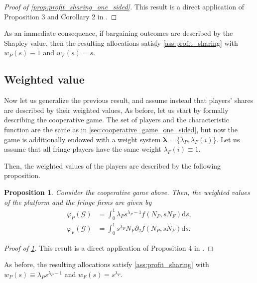 \documentclass[a4paper]{article}
\newtheorem{proposition}{Proposition}
\newcommand{\ds}{\mathrm{d}s}
\begin{document}
\begin{proof}[Proof of \cref{prop:profit_sharing_one_sided}]
    This result is a direct application of Proposition 3 and Corollary 2 in \textcite{stancsics2023value}.
\end{proof}

As an immediate consequence, if bargaining outcomes are described by the Shapley value, then the resulting allocations satisfy \cref{ass:profit_sharing} with $w_P(s) \equiv 1$ and $w_F(s) = s$.


\subsection{Weighted value}
\label{sec:cooperative_game_weighted}

Now let us generalize the previous result, and assume instead that players' shares are described by their weighted values,
As before, let us start by formally describing the cooperative game.
The set of players and the characteristic function are the same as in \cref{sec:cooperative_game_one_sided}, but now the game is additionally endowed with a weight system $\mathbf{\lambda} = \{\lambda_P, \lambda_{F}(i)\}$.
Let us assume that all fringe players have the same weight $\lambda_{F}(i) \equiv 1$.

Then, the weighted values of the players are described by the following proposition.

\begin{proposition}
    \label{prop:profit_sharing_weighted}
    Consider the cooperative game above.
    Then, the weighted values of the platform and the fringe firms are given by
    \begin{align*}
        \varphi_P(\mathcal{G}) &= \int_0^1 \lambda_P s ^ {\lambda_P - 1} f(N_P, s N_F) \ds, \\
        \varphi_F(\mathcal{G}) &= \int_0^1 s ^ {\lambda_P} N_F \partial_2 f(N_P, s N_F) \ds.
    \end{align*}
\end{proposition}

\begin{proof}[Proof of \cref{prop:profit_sharing_weighted}]
    This result is a direct application of Proposition 4 in \textcite{stancsics2023value}.
\end{proof}

As before, the resulting allocations satisfy \cref{ass:profit_sharing} with $w_P(s) \equiv \lambda_P s ^ {\lambda_P - 1}$ and $w_F(s) = s ^ {\lambda_P}$.
\end{document}
